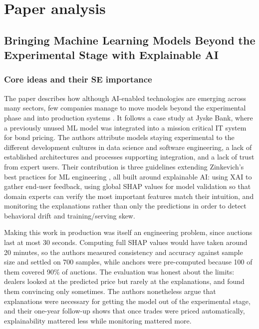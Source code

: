 \documentclass{article}
\begin{document}
\section{Paper analysis}

\subsection{Bringing Machine Learning Models Beyond the Experimental Stage with Explainable AI}

\subsubsection*{Core ideas and their SE importance}

The paper describes how although AI-enabled technologies are emerging across many sectors, few companies manage to move models beyond the experimental phase and into production systems \cite{mikkelsen2025xai}. It follows a case study at Jyske Bank, where a previously unused ML model was integrated into a mission critical IT system for bond pricing. The authors attribute models staying experimental to the different development cultures in data science and software engineering, a lack of established architectures and processes supporting integration, and a lack of trust from expert users. Their contribution is three guidelines extending Zinkevich's best practices for ML engineering \cite{zinkevich2017rules}, all built around explainable AI: using XAI to gather end-user feedback, using global SHAP values for model validation so that domain experts can verify the most important features match their intuition, and monitoring the explanations rather than only the predictions in order to detect behavioral drift and training/serving skew.

Making this work in production was itself an engineering problem, since auctions last at most 30 seconds. Computing full SHAP values would have taken around 20 minutes, so the authors measured consistency and accuracy against sample size and settled on 700 samples, while anchors were pre-computed because 100 of them covered 90\% of auctions. The evaluation was honest about the limits: dealers looked at the predicted price but rarely at the explanations, and found them convincing only sometimes. The authors nonetheless argue that explanations were necessary for getting the model out of the experimental stage, and their one-year follow-up shows that once trades were priced automatically, explainability mattered less while monitoring mattered more.
\end{document}
